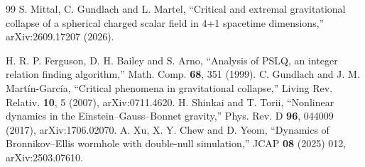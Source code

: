 \documentclass[11pt]{article}
\theoremstyle{remark}
\begin{document}
\begin{thebibliography}{99}
 S. Mittal, C. Gundlach and L. Martel, ``Critical and extremal gravitational collapse of a spherical
charged scalar field in 4+1 spacetime dimensions,'' arXiv:2609.17207 (2026).

 H. R. P. Ferguson, D. H. Bailey and S. Arno, ``Analysis of PSLQ, an integer relation finding
algorithm,'' Math. Comp. \textbf{68}, 351 (1999).
 C. Gundlach and J. M. Martín-García, ``Critical phenomena in gravitational collapse,'' Living Rev.
Relativ. \textbf{10}, 5 (2007), arXiv:0711.4620.
 H. Shinkai and T. Torii, ``Nonlinear dynamics in the Einstein--Gauss--Bonnet gravity,'' Phys. Rev. D
\textbf{96}, 044009 (2017), arXiv:1706.02070.
 A. Xu, X. Y. Chew and D. Yeom, ``Dynamics of Bronnikov--Ellis wormhole with double-null simulation,''
JCAP \textbf{08} (2025) 012, arXiv:2503.07610.

\end{thebibliography}
\end{document}
